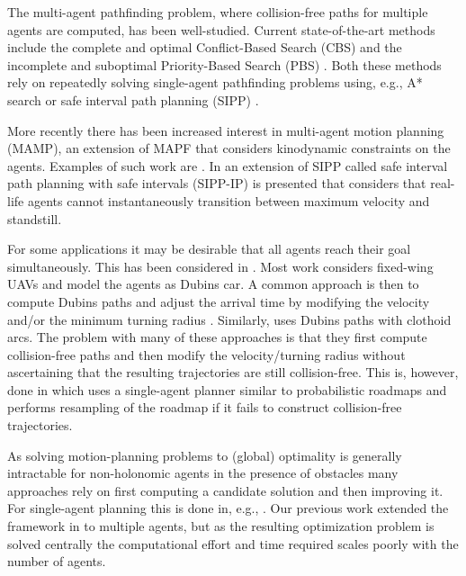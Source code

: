 \documentclass[letterpaper, 10 pt, conference]{ieeeconf}  %
\begin{document}
The multi-agent pathfinding problem, where collision-free paths for multiple agents are computed, has been well-studied. Current state-of-the-art methods include the complete and optimal Conflict-Based Search (CBS) \cite{sharon2015conflict, lee2021parallel, boyarski2015icbs} and the incomplete and suboptimal Priority-Based Search (PBS) \cite{ma2019searching}. Both these methods rely on repeatedly solving single-agent pathfinding problems using, e.g., A* search \cite{hart1968formal} or safe interval path planning (SIPP) \cite{phillips2011sipp}.

More recently there has been increased interest in multi-agent motion planning (MAMP), an extension of MAPF that considers kinodynamic constraints on the agents. Examples of such work are \cite{wen2022cl, kottinger2022conflict, yan2024multi, moldagalieva2024db, su2025collaborative}. In \cite{ali2023safe} an extension of SIPP called safe interval path planning with safe intervals (SIPP-IP) is presented that considers that real-life agents cannot instantaneously transition between maximum velocity and standstill.

For some applications it may be desirable that all agents reach their goal simultaneously. This has been considered in \cite{jiang2024multi, su2019multi, yin2025collaborative}. Most work considers fixed-wing UAVs and model the agents as Dubins car. A common approach is then to compute Dubins paths and adjust the arrival time by modifying the velocity and/or the minimum turning radius \cite{zhong2023efficient,gao2014cooperative}. Similarly, \cite{shanmugavel2010co} uses Dubins paths with clothoid arcs. The problem with many of these approaches is that they first compute collision-free paths and then modify the velocity/turning radius without ascertaining that the resulting trajectories are still collision-free. This is, however, done in \cite{babel2019coordinated} which uses a single-agent planner similar to probabilistic roadmaps and performs resampling of the roadmap if it fails to construct collision-free trajectories.

As solving motion-planning problems to (global) optimality is generally intractable for non-holonomic agents in the presence of obstacles many approaches rely on first computing a candidate solution and then improving it. For single-agent planning this is done in, e.g., \cite{bergman2020optimization}. Our previous work \cite{hellander2026optimized} extended the framework in \cite{bergman2020improved} to multiple agents, but as the resulting optimization problem is solved centrally the computational effort and time required scales poorly with the number of agents.
\end{document}

